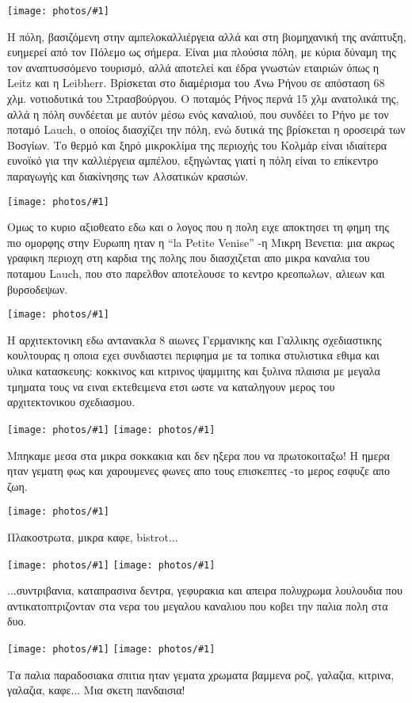 \documentclass[]{book}
\newcommand\photo[1]{\noindent\texttt{[image: photos/\#1]}}
\begin{document}
\photo{93.jpg}

Η πόλη, βασιζόμενη στην αμπελοκαλλιέργεια αλλά και στη βιομηχανική της ανάπτυξη, ευημερεί από τον Πόλεμο ως σήμερα. Είναι μια πλούσια πόλη, με κύρια δύναμη της τον αναπτυσσόμενο τουρισμό, αλλά αποτελεί και έδρα γνωστών εταιριών όπως η Leitz και η Leibherr.
Βρίσκεται στο διαμέρισμα του Άνω Ρήνου σε απόσταση 68 χλμ. νοτιοδυτικά του Στρασβούργου. Ο ποταμός Ρήνος περνά 15 χλμ ανατολικά της, αλλά η πόλη συνδέεται με αυτόν μέσω ενός καναλιού, που συνδέει το Ρήνο με τον ποταμό Lauch, ο οποίος διασχίζει την πόλη, ενώ δυτικά της βρίσκεται η οροσειρά των Βοσγίων. Το θερμό και ξηρό μικροκλίμα της περιοχής του Κολμάρ είναι ιδιαίτερα ευνοϊκό για την καλλιέργεια αμπέλου, εξηγώντας γιατί η πόλη είναι το επίκεντρο παραγωγής και διακίνησης των Αλσατικών κρασιών.

\photo{94.jpg}

Ομως το κυριο αξιοθεατο εδω και ο λογος που η πολη ειχε αποκτησει τη φημη της πιο ομορφης στην Ευρωπη ηταν η ``la Petite Venise'' -η Μικρη Βενετια: μια ακρως γραφικη περιοχη στη καρδια της πολης που διασχιζεται απο μικρα καναλια του ποταμου Lauch, που στο παρελθον αποτελουσε το κεντρο κρεοπωλων, αλιεων και βυρσοδεψων.

\photo{95.jpg}

Η αρχιτεκτονικη εδω αντανακλα 8 αιωνες Γερμανικης και Γαλλικης σχεδιαστικης κουλτουρας η οποια εχει συνδιαστει περιφημα με τα τοπικα στυλιστικα εθιμα και υλικα κατασκευης: κοκκινος και κιτρινος ψαμμιτης και ξυλινα πλαισια με μεγαλα τμηματα τους να ειναι εκτεθειμενα ετσι ωστε να καταληγουν μερος του αρχιτεκτονικου σχεδιασμου.

\photo{96.jpg}
\photo{97.jpg}

Μπηκαμε μεσα στα μικρα σοκκακια και δεν ηξερα που να πρωτοκοιταξω!
Η ημερα ηταν γεματη φως και χαρουμενες φωνες απο τους επισκεπτες -το μερος εσφυζε απο ζωη.

\photo{98.jpg}

Πλακοστρωτα, μικρα καφε, bistrot...

\photo{99.jpg}
\photo{100.jpg}

...συντριβανια, καταπρασινα δεντρα, γεφυρακια και απειρα πολυχρωμα λουλουδια που αντικατοπτριζονταν στα νερα του μεγαλου καναλιου που κοβει την παλια πολη στα δυο.

\photo{101.jpg}
\photo{102.jpg}

Τα παλια παραδοσιακα σπιτια ηταν γεματα χρωματα βαμμενα ροζ, γαλαζια, κιτρινα, γαλαζια, καφε...
Μια σκετη πανδαισια!
\end{document}
